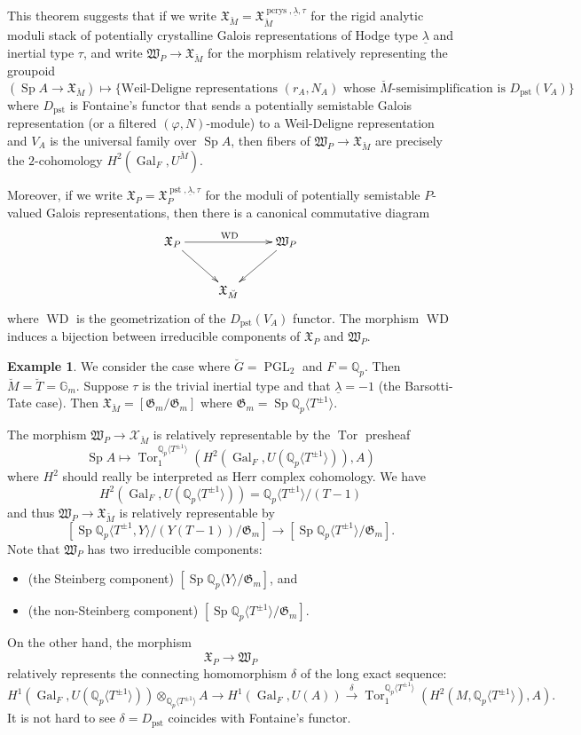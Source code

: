 \documentclass[11pt]{amsart}
\newcommand{\MINOREDITED}[1]{#1}
\theoremstyle{definition}
\newtheorem{example}[thm]{Example}
\newcommand{\Q}{\mathbb{Q}}
\newcommand{\G}{\mathbb{G}}
\newcommand{\fG}{\mathfrak{G}}
\newcommand{\pcrys}{{\operatorname{pcrys}}}
\newcommand{\pst}{{\operatorname{pst}}}
\newcommand{\cX}{\mathcal{X}}
\newcommand{\fX}{\mathfrak{X}}
\newcommand{\fW}{\mathfrak{W}}
\newcommand{\bG}{\breve{G}}
\newcommand{\bM}{\breve{M}}
\newcommand{\bT}{\breve{T}}
\DeclareMathOperator{\PGL}{PGL}
\DeclareMathOperator{\Sp}{Sp}
\DeclareMathOperator{\WD}{WD}
\DeclareMathOperator{\Tor}{Tor}
\DeclareMathOperator{\Gal}{Gal}
\begin{document}
This theorem suggests that
if we write
$\fX_{\bM}=\fX_{\bM}^{\pcrys,\underline{\lambda}, \tau}$
for the rigid analytic moduli stack
of potentially crystalline
Galois representations of Hodge type
$\underline{\lambda}$
and inertial type $\tau$,
and write
$\fW_{P}\to \fX_{\bM}$
for the morphism
relatively representing
the groupoid
\[
(\Sp A \to \fX_{\bM})\mapsto
\{\text{Weil-Deligne representations~}(r_A, N_A)
\text{~whose $\bM$-semisimplification is $D_{\text{pst}}(V_A)$}\}
\]
where $D_{\text{pst}}$ is
Fontaine's functor 
that sends a potentially semistable Galois representation
(or a filtered $(\varphi, N)$-module)
to
a Weil-Deligne representation
and $V_A$ is the universal family over $\Sp A$,
then fibers of
$\fW_{P}\to \fX_{\bM}$
are precisely the $2$-cohomology 
$
H^2(\Gal_F, U^{\bM}).
$

Moreover, if we write
$\fX_{P}=\fX_{P}^{\pst,\underline{\lambda}, \tau}$
for the moduli of potentially semistable
$P$-valued Galois representations,
then there is a canonical commutative diagram
\[
\xymatrix{
\fX_{P}\ar[rr]^{\WD}\ar[rd] & & \fW_P \ar[ld]
\\
& \fX_{\bM}
}
\]
where $\WD$ is the geometrization of the 
$D_{\text{pst}}(V_A)$ functor.
The morphism $\WD$ induces a bijection between irreducible components of $\fX_P$ and $\fW_P$.

\begin{example}
We consider the case where $\bG=\PGL_2$
and $F=\Q_p$.
Then $\bM=\bT=\G_m$.
Suppose $\tau$ is the trivial inertial type
and that $\underline{\lambda}=-1$
(the Barsotti-Tate case).
Then
$\fX_{\bM}=[\fG_m/\fG_m]$
where $\fG_m
=\Sp \Q_p\langle T^{\pm1}\rangle$.

The morphism $\fW_P\to \cX_{\bM}$
is relatively representable by the $\Tor$ presheaf
\[
\Sp A\mapsto
\Tor^{\Q_p\langle T^{\pm1}\rangle}_1
(H^2(\Gal_F, U(\Q_p\langle T^{\pm1}\rangle)), A)
\]
where $H^2$ should really be interpreted as Herr complex cohomology.
We have
\[
H^2(\Gal_F, U(\Q_p\langle T^{\pm1}\rangle))
=\Q_p\langle T^{\pm1}\rangle/(T-1)
\]
and thus
$\fW_P\to\fX_{\bM}$ is relatively representable by 
\[
[\Sp \Q_p\langle T^{\pm1}, Y\rangle/(Y(T-1))/\fG_m]
\to
[\Sp \Q_p\langle T^{\pm1}\rangle/\fG_m].
\]
Note that $\fW_P$ has two irreducible components:
\begin{itemize}
\item (the Steinberg component)
$[\Sp \Q_p\langle Y\rangle/\fG_m]$, and
\item (the non-Steinberg component)
$[\Sp \Q_p\langle T^{\pm1}\rangle/\fG_m]$.
\end{itemize}
On the other hand,
the morphism
\[
\fX_P\to \fW_P
\]
relatively represents the connecting homomorphism
$\delta$
of the long exact sequence:
\[
H^1(\Gal_F, U(\Q_p\langle T^{\pm1}\rangle))
\otimes_{\Q_p\langle T^{\pm1}\rangle}A
\to
H^1(\Gal_F, U(A))
\xrightarrow{\delta} \Tor_1^{\Q_p\langle T^{\pm1}\rangle}(H^2(M,\Q_p\langle T^{\pm1}\rangle),A).
\]
It is not hard to see
$\delta=D_{\pst}$
coincides with \MINOREDITED{Fontaine's} functor.
\end{example}
\end{document}
